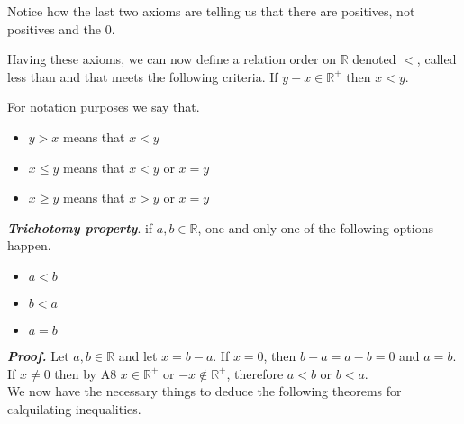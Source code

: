 \documentclass{report}
\begin{document}
    Notice how the last two axioms are telling us that there are positives, not positives and the $0$.

    Having these axioms, we can now define a relation order on $\mathbb{R}$ denoted $<$, called less than and that meets the following criteria. If $y-x \in \mathbb{R}^+$ then $x<y$.

    For notation purposes we say that.

    \begin{itemize}
        \item $y>x$ means that $x<y$
        \item $x \leq y$ means that $x<y$ or $x=y$
        \item $x \geq y$ means that $x>y$ or $x=y$
    \end{itemize}

    \begin{thBox}
        \textit{\textbf{Trichotomy property}}. if $a, b \in \mathbb{R}$, one and only one of the following options happen.

        \begin{itemize}
            \item $a<b$
            \item $b<a$
            \item $a=b$
        \end{itemize}
    \end{thBox}
    \textit{\textbf{Proof.}} Let $a,b \in \mathbb{R}$ and let $x = b - a$. If $x = 0$, then $b-a=a-b=0$ and $a=b$. If $x \not = 0$ then by A8 $x \in \mathbb{R}^+$ or $-x \not \in \mathbb{R}^+$, therefore $a < b$ or $b < a$.\\

    We now have the necessary things to deduce the following theorems for calquilating inequalities.
\end{document}
